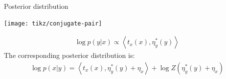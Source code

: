 \documentclass[10pt, compress]{beamer}
\begin{document}
\begin{frame}{Posterior distribution}
   \begin{center}
        \texttt{[image: tikz/conjugate-pair]}
   \end{center}
  \begin{align*}
    \log p(y | x) \propto \left\langle t_x(x), \eta^*_y(y)\right\rangle
  \end{align*}
  \pause
  The corresponding posterior distribution is:
  \begin{align*}
    \log p(x | y) = \left\langle t_x(x), \eta^*_y(y) + \eta_x\right\rangle + \log Z(\eta^*_y(y) + \eta_x)
  \end{align*}
  \pause
  \centering
\end{frame}

\fi

\end{document}
